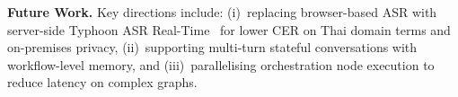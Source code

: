 \documentclass[10pt, a4paper, twocolumn]{article}
\begin{document}
\noindent\textbf{Future Work.}
Key directions include: (i)~replacing browser-based ASR with server-side Typhoon ASR Real-Time~\cite{sirichotedumrong2026typhoonasr} for lower CER on Thai domain terms and on-premises privacy, (ii)~supporting multi-turn stateful conversations with workflow-level memory, and (iii)~parallelising orchestration node execution to reduce latency on complex graphs.



\end{document}

